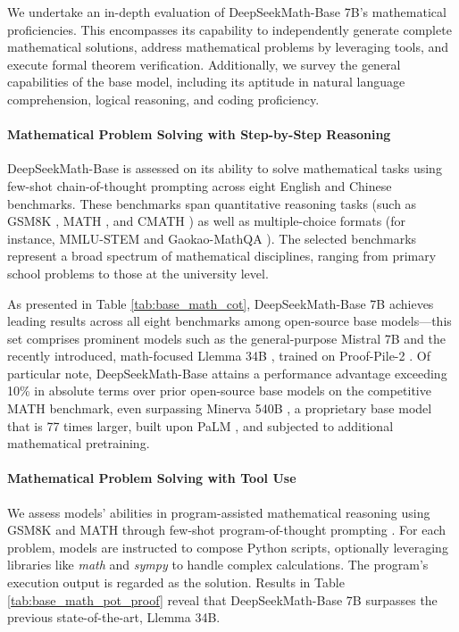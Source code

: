 We undertake an in-depth evaluation of DeepSeekMath-Base 7B’s mathematical proficiencies. This encompasses its capability to independently generate complete mathematical solutions, address mathematical problems by leveraging tools, and execute formal theorem verification. Additionally, we survey the general capabilities of the base model, including its aptitude in natural language comprehension, logical reasoning, and coding proficiency.

\paragraph{Mathematical Problem Solving with Step-by-Step Reasoning}

DeepSeekMath-Base is assessed on its ability to solve mathematical tasks using few-shot chain-of-thought prompting \citep{cot} across eight English and Chinese benchmarks. These benchmarks span quantitative reasoning tasks (such as GSM8K \citep{gsm8k}, MATH \citep{MATH}, and CMATH \citep{wei2023cmath}) as well as multiple-choice formats (for instance, MMLU-STEM \citep{mmlu} and Gaokao-MathQA \citep{agieval}). The selected benchmarks represent a broad spectrum of mathematical disciplines, ranging from primary school problems to those at the university level.

As presented in Table \ref{tab:base_math_cot}, DeepSeekMath-Base 7B achieves leading results across all eight benchmarks among open-source base models—this set comprises prominent models such as the general-purpose Mistral 7B \citep{mistral} and the recently introduced, math-focused Llemma 34B \citep{llemma}, trained on Proof-Pile-2 \citep{llemma}. Of particular note, DeepSeekMath-Base attains a performance advantage exceeding 10\% in absolute terms over prior open-source base models on the competitive MATH benchmark, even surpassing Minerva 540B \citep{minerva}, a proprietary base model that is 77 times larger, built upon PaLM \citep{palm}, and subjected to additional mathematical pretraining.

\paragraph{Mathematical Problem Solving with Tool Use} We assess models’ abilities in program-assisted mathematical reasoning using GSM8K and MATH through few-shot program-of-thought prompting \citep{pot,pal}. For each problem, models are instructed to compose Python scripts, optionally leveraging libraries like \textit{math} and \textit{sympy} to handle complex calculations. The program’s execution output is regarded as the solution. Results in Table \ref{tab:base_math_pot_proof} reveal that DeepSeekMath-Base 7B surpasses the previous state-of-the-art, Llemma 34B.

